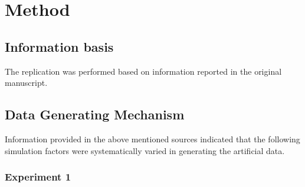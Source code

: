 \documentclass[10,a4paperpaper,]{article}
\begin{document}
\section{Method}

\subsection{Information basis}

The replication was performed based on information reported in the
original manuscript.

\subsection{Data Generating Mechanism}

Information provided in the above mentioned sources indicated that the
following simulation factors were systematically varied in generating
the artificial data.

\subsubsection{Experiment 1}
\end{document}
